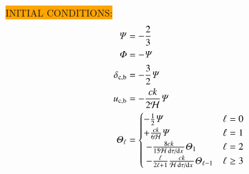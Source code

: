 \noindent\colorbox{orange}{INITIAL CONDITIONS:}
\begin{subequations}\label{mil3:theo:eq:initial_conditions}
\begin{align}
    \Psi     &= -\frac{2}{3}     \label{mil3:theo:eq:init_Psi}\\
    \Phi     &= -\Psi         \label{mil3:theo:eq:init_Phi}\\
    \delta\ped{c, b}&= -\frac{3}{2} \Psi     \label{mil3:theo:eq:init_delta}\\
    u\ped{c, b}     &= -\frac{ck}{2\Hp} \Psi \label{mil3:theo:eq:init_u}\\
    \Theta_\ell &=\begin{cases}
        -\frac{1}{2}\Psi     & \ell = 0  \\
        +\frac{ck}{6\Hp}\Psi  & \ell = 1 \\ 
        -\frac{8ck}{15\Hp\dv*{\tau}{x}}\Theta_1    & \ell = 2 \\ 
        -\frac{\ell}{2\ell+1} \frac{ck}{\Hp\dv*{\tau}{x}} \Theta_{\ell-1} &\ell \geq 3
    \end{cases} \label{mil3:theo:eq:init_Theta}
\end{align}
\end{subequations}
